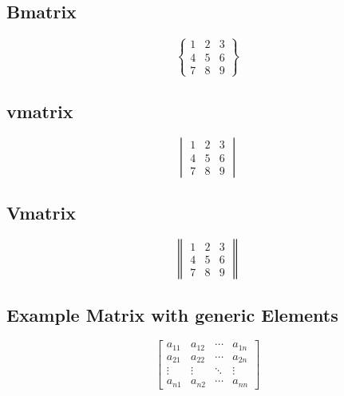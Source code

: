 \documentclass{article}
\begin{document}
	\subsection{Bmatrix}
	\[
	\begin{Bmatrix}
	1&2&3\\
	4&5&6\\
	7&8&9
	\end{Bmatrix}
	\]
	\subsection{vmatrix}
	\[
	\begin{vmatrix}
	1&2&3\\
	4&5&6\\
	7&8&9
	\end{vmatrix}
	\]
	\subsection{Vmatrix}
	\[
	\begin{Vmatrix}
	1&2&3\\
	4&5&6\\
	7&8&9
	\end{Vmatrix}
	\]
	
	\subsection{Example Matrix with generic Elements}
	\[\begin{bmatrix}
	a_{11}&a_{12}&\cdots &a_{1n} \\
	a_{21}&a_{22}&\cdots &a_{2n} \\
	\vdots & \vdots & \ddots & \vdots\\
	a_{n1}&a_{n2}&\cdots &a_{nn}
	\end{bmatrix}\]
\end{document}
